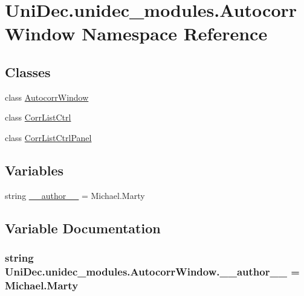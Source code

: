 \hypertarget{namespace_uni_dec_1_1unidec__modules_1_1_autocorr_window}{}\section{Uni\+Dec.\+unidec\+\_\+modules.\+Autocorr\+Window Namespace Reference}
\label{namespace_uni_dec_1_1unidec__modules_1_1_autocorr_window}
\subsection*{Classes}
\begin{DoxyCompactItemize}
\item 
class \hyperlink{class_uni_dec_1_1unidec__modules_1_1_autocorr_window_1_1_autocorr_window}{Autocorr\+Window}
\item 
class \hyperlink{class_uni_dec_1_1unidec__modules_1_1_autocorr_window_1_1_corr_list_ctrl}{Corr\+List\+Ctrl}
\item 
class \hyperlink{class_uni_dec_1_1unidec__modules_1_1_autocorr_window_1_1_corr_list_ctrl_panel}{Corr\+List\+Ctrl\+Panel}
\end{DoxyCompactItemize}
\subsection*{Variables}
\begin{DoxyCompactItemize}
\item 
string \hyperlink{namespace_uni_dec_1_1unidec__modules_1_1_autocorr_window_aba29c36f0636cd525900e56977e59b38}{\+\_\+\+\_\+author\+\_\+\+\_\+} = \textquotesingle{}Michael.\+Marty\textquotesingle{}
\end{DoxyCompactItemize}


\subsection{Variable Documentation}
\hypertarget{namespace_uni_dec_1_1unidec__modules_1_1_autocorr_window_aba29c36f0636cd525900e56977e59b38}{}
\subsubsection[{\+\_\+\+\_\+author\+\_\+\+\_\+}]{\setlength{\rightskip}{0pt plus 5cm}string Uni\+Dec.\+unidec\+\_\+modules.\+Autocorr\+Window.\+\_\+\+\_\+author\+\_\+\+\_\+ = \textquotesingle{}Michael.\+Marty\textquotesingle{}}\label{namespace_uni_dec_1_1unidec__modules_1_1_autocorr_window_aba29c36f0636cd525900e56977e59b38}
